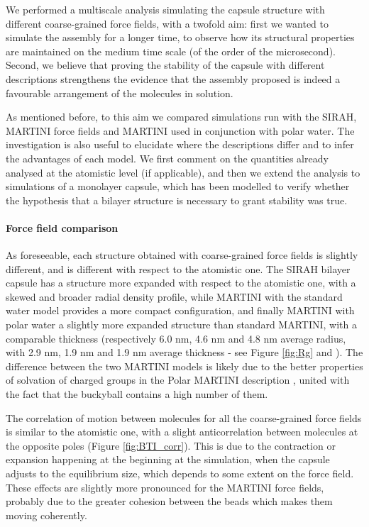 We performed a multiscale analysis simulating the capsule structure with different coarse-grained force fields, with a twofold aim: first we wanted to simulate the assembly for a longer time, to observe how its structural properties are maintained on the medium time scale (of the order of the microsecond). Second, we believe that proving the stability of the capsule with different descriptions strengthens the evidence that the assembly proposed is indeed a favourable arrangement of the molecules in solution.

As mentioned before, to this aim we compared simulations run with the SIRAH, MARTINI force fields and MARTINI used in conjunction with polar water. The investigation is also useful to elucidate where the descriptions differ and to infer the advantages of each model.
%
We first comment on the quantities already analysed at the atomistic level (if applicable), and then we extend the analysis to simulations of a monolayer capsule, which has been modelled to verify whether the hypothesis that a bilayer structure is necessary to grant stability was true.

\paragraph{Force field comparison}
As foreseeable, each structure obtained with coarse-grained force fields is slightly different, and is different with respect to the atomistic one.
%
The SIRAH bilayer capsule has a structure more expanded with respect to the atomistic one, with a skewed and broader radial density profile, while MARTINI with the standard water model provides a more compact configuration, and finally MARTINI with polar water a slightly more expanded structure than standard MARTINI, with a comparable thickness (respectively 6.0 nm, 4.6 nm and 4.8 nm average radius, with 2.9 nm, 1.9 nm and 1.9 nm average thickness - see Figure \ref{fig:Rg} and ).
%
The difference between the two MARTINI models is likely due to the better properties of solvation of charged groups in the Polar MARTINI description \citep{Yesylevskyy2010}, united with the fact that the buckyball contains a high number of them.

The correlation of motion between molecules for all the coarse-grained force fields is similar to the atomistic one, with a slight anticorrelation between molecules at the opposite poles (Figure \ref{fig:BTI_corr}). This is due to the contraction or expansion happening at the beginning at the simulation, when the capsule adjusts to the equilibrium size, which depends to some extent on the force field.
%
These effects are slightly more pronounced for the MARTINI force fields, probably due to the greater cohesion between the beads which makes them moving coherently.

